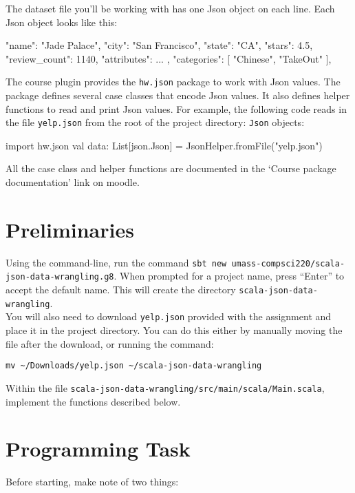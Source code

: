 The dataset file you'll be working with has one Json object on each line. Each
Json object looks like this:
    \begin{scalacode}
    {
        "name": "Jade Palace",
        "city": "San Francisco",
        "state": "CA",
        "stars": 4.5,
        "review_count": 1140,
        "attributes": { ... },
        "categories": [ "Chinese", "TakeOut" ],
    }
    \end{scalacode}
The course plugin provides the \lstinline|hw.json| package to work with Json
values. The package defines several case classes that encode Json values. It
also defines helper functions to read and print Json values. For example,
the following code reads in the file \texttt{yelp.json} from the root of the
project directory:
\texttt{Json} objects:
\begin{scalacode}
import hw.json
val data: List[json.Json] = JsonHelper.fromFile("yelp.json")
\end{scalacode}

\noindent All the case class and helper functions are documented in the `Course
package documentation' link on moodle.

\section{Preliminaries}

Using the command-line, run the command
\verb|sbt new umass-compsci220/scala-json-data-wrangling.g8|. When prompted for
a project name, press ``Enter'' to accept the default name. This will create
the directory \verb|scala-json-data-wrangling|.
\\
\noindent You will also need to download \verb|yelp.json| provided with the
assignment and place it in the project directory. You can do this either by
manually moving the file after the download, or running the command:
\begin{verbatim}
mv ~/Downloads/yelp.json ~/scala-json-data-wrangling
\end{verbatim}

\noindent Within the file \verb|scala-json-data-wrangling/src/main/scala/Main.scala|,
implement the functions described below.

\section{Programming Task}

Before starting, make note of two things:

